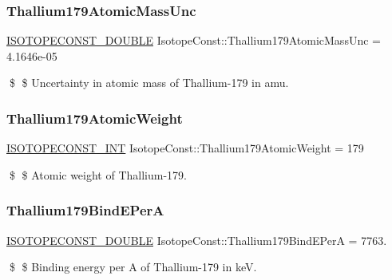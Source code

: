\subsubsection{\texorpdfstring{Thallium179\+Atomic\+Mass\+Unc}{Thallium179AtomicMassUnc}}
{\footnotesize\ttfamily \mbox{\hyperlink{group___isotope_const-_macros_ga8f45a7272ce02c0b4c65c44636ed719a}{I\+S\+O\+T\+O\+P\+E\+C\+O\+N\+S\+T\+\_\+\+D\+O\+U\+B\+LE}} Isotope\+Const\+::\+Thallium179\+Atomic\+Mass\+Unc = 4.\+1646e-\/05}

\$ \$ Uncertainty in atomic mass of Thallium-\/179 in amu. \mbox{\label{group___isotope_const-_thallium-_tl179_ga719ad4c046359876ea81f574038f0734}} 
\subsubsection{\texorpdfstring{Thallium179\+Atomic\+Weight}{Thallium179AtomicWeight}}
{\footnotesize\ttfamily \mbox{\hyperlink{group___isotope_const-_macros_ga5f18360b3e99483a35c32d789e62621c}{I\+S\+O\+T\+O\+P\+E\+C\+O\+N\+S\+T\+\_\+\+I\+NT}} Isotope\+Const\+::\+Thallium179\+Atomic\+Weight = 179}

\$ \$ Atomic weight of Thallium-\/179. \mbox{\label{group___isotope_const-_thallium-_tl179_ga4d9b4d51eeef92d3455c0348bd644aa1}} 
\subsubsection{\texorpdfstring{Thallium179\+Bind\+E\+PerA}{Thallium179BindEPerA}}
{\footnotesize\ttfamily \mbox{\hyperlink{group___isotope_const-_macros_ga8f45a7272ce02c0b4c65c44636ed719a}{I\+S\+O\+T\+O\+P\+E\+C\+O\+N\+S\+T\+\_\+\+D\+O\+U\+B\+LE}} Isotope\+Const\+::\+Thallium179\+Bind\+E\+PerA = 7763.}

\$ \$ Binding energy per A of Thallium-\/179 in keV. \mbox{\label{group___isotope_const-_thallium-_tl179_ga42d8b113590c0f0e43d389772be5b87f}} 
